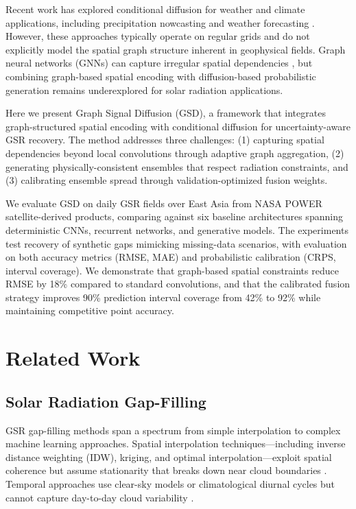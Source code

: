 \documentclass[preprint,12pt]{elsarticle}
\begin{document}
Recent work has explored conditional diffusion for weather and climate applications, including precipitation nowcasting \cite{gao2022diffusion} and weather forecasting \cite{price2024gencast}. However, these approaches typically operate on regular grids and do not explicitly model the spatial graph structure inherent in geophysical fields. Graph neural networks (GNNs) can capture irregular spatial dependencies \cite{kipf2017semi, bronstein2017geometric}, but combining graph-based spatial encoding with diffusion-based probabilistic generation remains underexplored for solar radiation applications.

Here we present Graph Signal Diffusion (GSD), a framework that integrates graph-structured spatial encoding with conditional diffusion for uncertainty-aware GSR recovery. The method addresses three challenges: (1) capturing spatial dependencies beyond local convolutions through adaptive graph aggregation, (2) generating physically-consistent ensembles that respect radiation constraints, and (3) calibrating ensemble spread through validation-optimized fusion weights.

We evaluate GSD on daily GSR fields over East Asia from NASA POWER satellite-derived products, comparing against six baseline architectures spanning deterministic CNNs, recurrent networks, and generative models. The experiments test recovery of synthetic gaps mimicking missing-data scenarios, with evaluation on both accuracy metrics (RMSE, MAE) and probabilistic calibration (CRPS, interval coverage). We demonstrate that graph-based spatial constraints reduce RMSE by 18\% compared to standard convolutions, and that the calibrated fusion strategy improves 90\% prediction interval coverage from 42\% to 92\% while maintaining competitive point accuracy.


\section{Related Work}
\label{sec:related}

\subsection{Solar Radiation Gap-Filling}

GSR gap-filling methods span a spectrum from simple interpolation to complex machine learning approaches. Spatial interpolation techniques---including inverse distance weighting (IDW), kriging, and optimal interpolation---exploit spatial coherence but assume stationarity that breaks down near cloud boundaries \cite{cressie1990origins, hudson1997kriging}. Temporal approaches use clear-sky models or climatological diurnal cycles but cannot capture day-to-day cloud variability \cite{ineichen2002new}.
\end{document}
